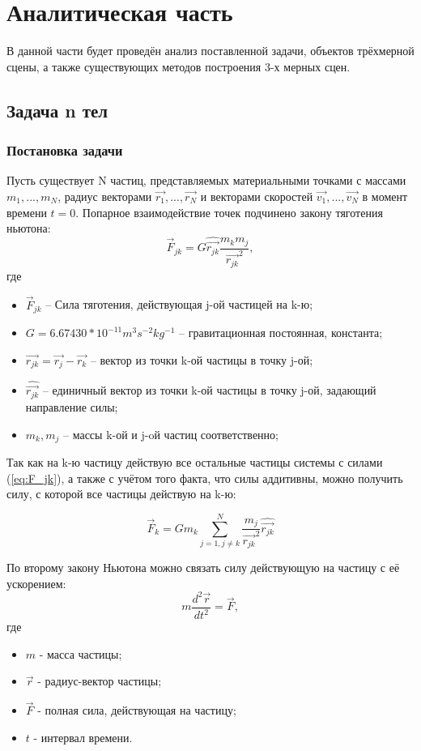 \chapter{Аналитическая часть}

В данной части будет проведён анализ поставленной задачи, объектов трёхмерной сцены, а также существующих методов построения 3-х мерных сцен.

\section{Задача n тел}
\subsection{Постановка задачи}
Пусть существует N частиц, представляемых материальными точками с массами $m_1, ..., m_N$, радиус векторами $\vec{r_1}, ..., \vec{r_N}$ и векторами скоростей $\vec{v_1}, ..., \vec{v_N}$ в момент времени $t=0$.
Попарное взаимодействие точек подчинено закону тяготения ньютона:
\begin{equation}
	\label{eq:F_jk}
	\vec{F}_{jk} = G\hat{\vec{r_{jk}}}\frac{m_km_j}{\vec{r_{jk}}^2},
\end{equation}
где
\begin{itemize}
	\item $\vec{F}_{jk}$ -- Сила тяготения, действующая j-ой частицей на k-ю;
	\item $G = 6.67430 * 10^{-11} m^3s^{-2}kg^{-1}$ -- гравитационная постоянная, константа;
	\item $\vec{r_{jk}} = \vec{r_j} - \vec{r_k}$ -- вектор из точки k-ой частицы в точку j-ой;
	\item $\hat{\vec{r_{jk}}}$ -- единичный вектор из точки k-ой частицы в точку j-ой, задающий направление силы;
	\item $m_k, m_j$ -- массы k-ой и j-oй частиц соответственно;
\end{itemize}

Так как на k-ю частицу действую все остальные частицы системы с силами (\ref{eq:F_jk}), а также с учётом того факта, что силы аддитивны, можно получить силу, с которой все частицы действую на k-ю:

\begin{equation}
	\label{eq:F_sumk}
	\vec{F}_{k} = Gm_k\sum_{j=1, j \neq k}^{N}{\frac{m_j}{\vec{r_{jk}}^2}\hat{\vec{r_{jk}}}}
\end{equation}

По второму закону Ньютона можно связать силу действующую на частицу с её ускорением:
\begin{equation}
	\label{eq:newton2}
	m\frac{d^2\vec{r}}{dt^2} = \vec{F},
\end{equation}
где
\begin{itemize}
	\item $m$ - масса частицы;
	\item $\vec{r}$ - радиус-вектор частицы;
	\item $\vec{F}$ - полная сила, действующая на частицу;
	\item $t$ - интервал времени.
\end{itemize}

